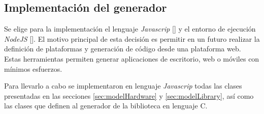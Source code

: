 \subsection{Implementación del generador}

Se elige para la implementación el lenguaje \emph{Javascrip} [] y el entorno de ejecución \emph{NodeJS} []. El motivo principal de esta decisión es permitir en un futuro realizar la definición de plataformas y generación de código desde una plataforma web. Estas herramientas permiten generar aplicaciones de escritorio, web o móviles con mínimos esfuerzos.

Para llevarlo a cabo se implementaron en lenguaje \emph{Javascrip} todas las clases presentadas en las secciones \ref{sec:modelHardware} y \ref{sec:modelLibrary}, así como las clases que definen al generador de la biblioteca en lenguaje C.

